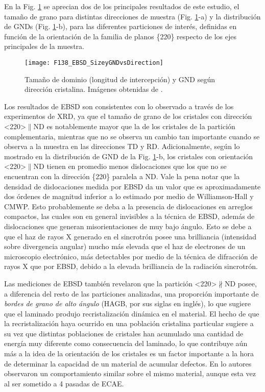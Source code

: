 En la Fig. \ref{fig:F138EBSDNati} se aprecian dos de los principales resultados de este estudio, el tamaño de grano para distintas direcciones de muestra (Fig. \ref{fig:F138EBSDNati}-a) y la distribución de GNDs (Fig. \ref{fig:F138EBSDNati}-b), para las diferentes particiones de interés, definidas en función de la orientación de la familia de planos \{220\} respecto de los ejes principales de la muestra.

\begin{figure}[!htb]
  \centering
  \texttt{[image: F138\_EBSD\_SizeyGNDvsDirection]}
  \caption{Tamaño de dominio (longitud de intercepción) y GND según dirección cristalina. Imágenes obtenidas de \cite{Devincentis2017}.}
  \label{fig:F138EBSDNati}
\end{figure}

Los resultados de EBSD son consistentes con lo observado a través de los experimentos de XRD, ya que el tamaño de grano de los cristales con dirección \textless220\textgreater$\parallel$ND es notablemente mayor que la de los cristales de la partición complementaria, mientras que no se observa un cambio tan importante cuando se observa a la muestra en las direcciones TD y RD.
Adicionalmente, según lo mostrado en la distribución de GND de la Fig. \ref{fig:F138EBSDNati}-b, los cristales con orientación \textless220\textgreater$\parallel$ND tienen en promedio menos dislocaciones que los que no se encuentran con la dirección \{220\} paralela a ND.
Vale la pena notar que la densidad de dislocaciones medida por EBSD da un valor que es aproximadamente dos órdenes de magnitud inferior a lo estimado por medio de Williamson-Hall y CMWP.
Esto probablemente se deba a la presencia de dislocaciones en arreglos compactos, las cuales son en general invisibles a la técnica de EBSD, además de dislocaciones que generan misorientaciones de muy bajo ángulo. 
Esto se debe a que el haz de rayos X generado en el sincrotrón posee una brilliancia (intensidad sobre divergencia angular) mucho más elevada que el haz de electrones de un microscopio electrónico, más detectables por medio de la técnica de difracción de rayos X que por EBSD, debido a la elevada brilliancia de la radiación sincrotrón.

Las mediciones de EBSD también revelaron que la partición \textless220\textgreater$\nparallel$ND posee, a diferencia del resto de las particiones analizadas, una proporción importante de \textit{bordes de grano de alto ángulo} (HAGB, por sus siglas en inglés), lo que sugiere que el laminado produjo recristalización dinámica en el material.
El hecho de que la recristalización haya ocurrido en una población cristalina particular sugiere a su vez que distintas poblaciones de cristales han acumulado una cantidad de energía muy diferente como consecuencia del laminado, lo que contribuye aún más a la idea de la orientación de los cristales es un factor importante a la hora de determinar la capacidad de un material de acumular defectos.
En \cite{Devincentis2015} lo autores observaron un comportamiento similar sobre el mismo material, aunque esta vez al ser sometido a 4 pasadas de ECAE.

